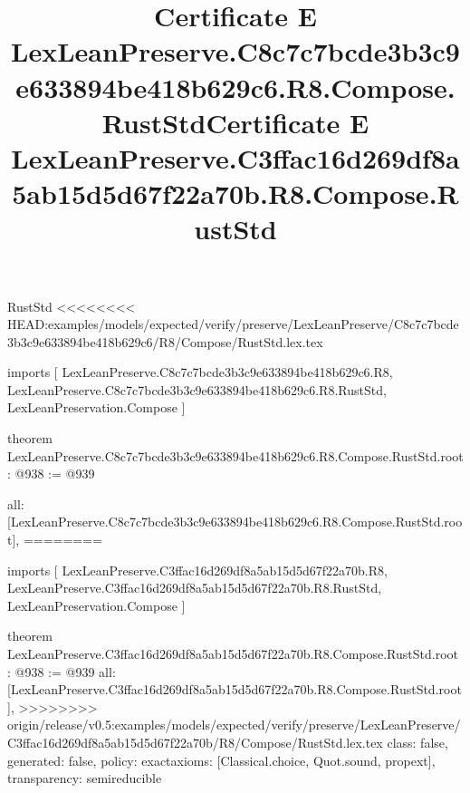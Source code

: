 \begin{lexlean}{RustStd}
<<<<<<<< HEAD:examples/models/expected/verify/preserve/LexLeanPreserve/C8c7c7bcde3b3c9e633894be418b629c6/R8/Compose/RustStd.lex.tex
\title{Certificate E LexLeanPreserve.C8c7c7bcde3b3c9e633894be418b629c6.R8.Compose.RustStd}
\begin{coremodule}
imports [
  LexLeanPreserve.C8c7c7bcde3b3c9e633894be418b629c6.R8,
  LexLeanPreserve.C8c7c7bcde3b3c9e633894be418b629c6.R8.RustStd,
  LexLeanPreservation.Compose
]

theorem LexLeanPreserve.C8c7c7bcde3b3c9e633894be418b629c6.R8.Compose.RustStd.root : @938 := @939 {
  all: [LexLeanPreserve.C8c7c7bcde3b3c9e633894be418b629c6.R8.Compose.RustStd.root],
========
\title{Certificate E LexLeanPreserve.C3ffac16d269df8a5ab15d5d67f22a70b.R8.Compose.RustStd}
\begin{coremodule}
imports [
  LexLeanPreserve.C3ffac16d269df8a5ab15d5d67f22a70b.R8,
  LexLeanPreserve.C3ffac16d269df8a5ab15d5d67f22a70b.R8.RustStd,
  LexLeanPreservation.Compose
]

theorem LexLeanPreserve.C3ffac16d269df8a5ab15d5d67f22a70b.R8.Compose.RustStd.root : @938 := @939 {
  all: [LexLeanPreserve.C3ffac16d269df8a5ab15d5d67f22a70b.R8.Compose.RustStd.root],
>>>>>>>> origin/release/v0.5:examples/models/expected/verify/preserve/LexLeanPreserve/C3ffac16d269df8a5ab15d5d67f22a70b/R8/Compose/RustStd.lex.tex
  class: false,
  generated: false,
  policy: exact{axioms: [Classical.choice, Quot.sound, propext]},
  transparency: semireducible
}


\end{coremodule}}
\end{coremodule}
\end{lexlean}

